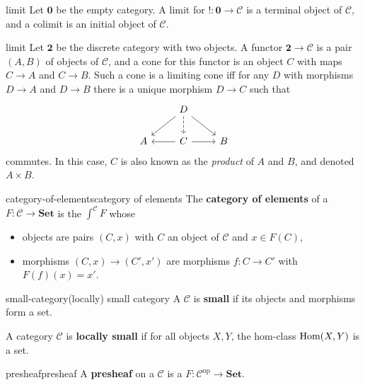 \begin{example}{limit}
    Let $\textbf{0}$ be the empty category. A limit for $! : \textbf{0} \to \mathcal{C}$ is a terminal object of $\mathcal{C}$, and a colimit is an initial object of $\mathcal{C}$.
\end{example}

\begin{example}{limit}
    Let $\textbf{2}$ be the discrete category with two objects. A functor $\textbf{2} \to \mathcal{C}$ is a pair $(A, B)$ of objects of $\mathcal{C}$, and a cone for this functor is an object $C$ with maps $C \to A$ and $C \to B$. Such a cone is a limiting cone iff for any $D$ with morphisms $D \to A$ and $D \to B$ there is a unique morphism $D \to C$ such that
    \[ \begin{tikzcd} & D \arrow[dashed]{d} \arrow{ld} \arrow{rd} & \\ A & \arrow{l} C \arrow{r} & B \end{tikzcd} \]
    commutes. In this case, $C$ is also known as the \textit{product} of $A$ and $B$, and denoted $A \times B$.
\end{example}

\begin{topic}{category-of-elements}{category of elements}
    The \textbf{category of elements} of a  $F : \mathcal{C} \to \textbf{Set}$ is the  $\int^{\mathcal{C}} F$ whose
    \begin{itemize}
        \item objects are pairs $(C, x)$ with $C$ an object of $\mathcal{C}$ and $x \in F(C)$,
        \item morphisms $(C, x) \to (C', x')$ are morphisms $f : C \to C'$ with $F(f)(x) = x'$.
    \end{itemize}
\end{topic}

\begin{topic}{small-category}{(locally) small category}
    A  $\mathcal{C}$ is \textbf{small} if its objects and morphisms form a set.
    
    A category $\mathcal{C}$ is \textbf{locally small} if for all objects $X, Y$, the hom-class $\text{Hom}(X, Y)$ is a set.
\end{topic}

\begin{topic}{presheaf}{presheaf}
    A \textbf{presheaf} on a  $\mathcal{C}$ is a  $F : \mathcal{C}^\text{op} \to \textbf{Set}$.
\end{topic}


